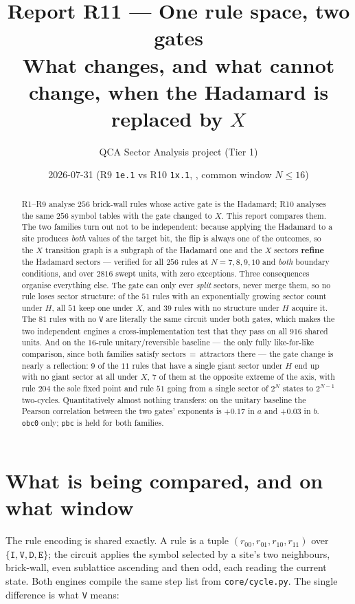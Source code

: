 \documentclass[11pt]{article}
\title{\textbf{Report R11 --- One rule space, two gates}\\
\large What changes, and what cannot change, when the Hadamard is replaced by
$X$}
\author{QCA Sector Analysis project (Tier 1)}
\date{2026-07-31 \quad\small(R9 \texttt{1e.1} vs R10 \texttt{1x.1}, \rt{obc0},
common window $N\le16$)}
\newcommand{\rt}[1]{\texttt{#1}}
\newcommand{\fn}[1]{\texttt{#1}}
\theoremstyle{plain}
\theoremstyle{remark}
\begin{document}
\maketitle

\begin{abstract}
R1--R9 analyse $256$ brick-wall rules whose active gate is the Hadamard; R10
analyses the same $256$ symbol tables with the gate changed to $X$. This report
compares them. The two families turn out not to be independent: because applying
the Hadamard to a site produces \emph{both} values of the target bit, the flip is
always one of the outcomes, so the $X$ transition graph is a subgraph of the
Hadamard one and the $X$ sectors \textbf{refine} the Hadamard sectors --- verified
for all $256$ rules at $N=7,8,9,10$ and \emph{both} boundary conditions, and over
$2816$ swept units, with zero exceptions. Three consequences organise everything else. The gate can only ever
\emph{split} sectors, never merge them, so no rule loses sector structure: of the
$51$ rules with an exponentially growing sector count under $H$, all $51$ keep one
under $X$, and $39$ rules with no structure under $H$ acquire it. The $81$ rules
with no \rt{V} are literally the same circuit under both gates, which makes the
two independent engines a cross-implementation test that they pass on all $916$
shared units. And on the $16$-rule unitary/reversible baseline --- the only fully
like-for-like comparison, since both families satisfy sectors\,$=$\,attractors
there --- the gate change is nearly a reflection: $9$ of the $11$ rules that have
a single giant sector under $H$ end up with no giant sector at all under $X$,
$7$ of them at the opposite extreme of the axis, with rule $204$ the sole fixed point and
rule $51$ going from a single sector of $2^N$ states to $2^{N-1}$ two-cycles.
Quantitatively almost nothing transfers: on the unitary baseline the Pearson
correlation between the two gates' exponents is $+0.17$ in $a$ and $+0.03$ in
$b$. \rt{obc0} only; \rt{pbc} is held for both families.
\end{abstract}

\tableofcontents

\section{What is being compared, and on what window}
\label{sec:method}

The rule encoding is shared exactly. A rule is a tuple
$(r_{00},r_{01},r_{10},r_{11})$ over $\{\rt{I},\rt{V},\rt{D},\rt{E}\}$; the
circuit applies the symbol selected by a site's two neighbours, brick-wall, even
sublattice ascending and then odd, each reading the current state. Both engines
compile the same step list from \fn{core/cycle.py}. The single difference is what
\rt{V} means:
\end{document}
